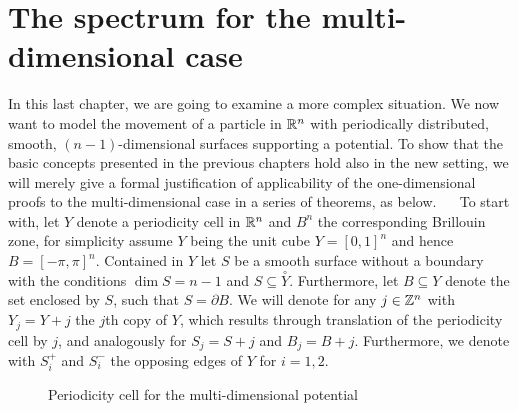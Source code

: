 \chapter{The spectrum for the multi-dimensional case} \label{chap5}

In this last chapter, we are going to examine a more complex situation. We now want to model the movement of a particle in $\mathbb{R}^{n}$ with periodically distributed, smooth, $(n-1)$-dimensional surfaces supporting a potential. To show that the basic concepts presented in the previous chapters hold also in the new setting, we will merely give a formal justification of applicability of the one-dimensional proofs to the multi-dimensional case in a series of theorems, as below.
~\newline ~\newline
To start with, let $Y$ denote a periodicity cell in $\mathbb{R}^{n}$ and $B^{n}$ the corresponding Brillouin zone, for simplicity assume $Y$ being the unit cube $Y = [0, 1]^{n}$ and hence $B = [-\pi, \pi]^{n}$. Contained in $Y$ let $S$ be a smooth surface without a boundary with the conditions $\dim S = n - 1$ and $S \subseteq \overset{\circ}{Y}$. Furthermore, let $B \subseteq Y$ denote the set enclosed by $S$, such that $S = \partial B$. We will denote for any $j \in \mathbb{Z}^{n}$ with $Y_{j} = Y + j$ the $j$th copy of $Y$, which results through translation of the periodicity cell by $j$, and analogously for $S_{j} = S + j$ and $B_{j} = B + j$. Furthermore, we denote with $S_{i}^{+}$ and $S_{i}^{-}$ the opposing edges of $Y$ for $i = 1, 2$.

\begin{figure}[!ht] \centering
	\caption{Periodicity cell for the multi-dimensional potential}
\end{figure}

